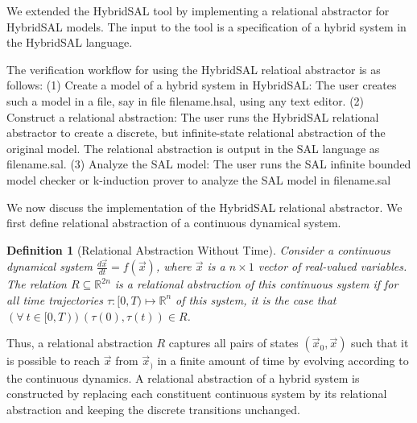 \documentclass{article}
\newtheorem{definition}{Definition}
\begin{document}
We extended the HybridSAL tool by implementing a 
relational abstractor for HybridSAL models.
The input to the tool is a specification of a hybrid system 
in the HybridSAL language.  

The verification workflow for using the HybridSAL relatioal
abstractor is as follows:
(1) Create a model of a hybrid system in HybridSAL:
 The user creates such a model in a file, say in 
 file filename.hsal, using any text editor.
(2) Construct a relational abstraction:
 The user runs the HybridSAL relational abstractor to create a discrete,
 but infinite-state relational abstraction of the original model.
 The relational abstraction is output in the SAL language as
 filename.sal.
(3) Analyze the SAL model:
 The user runs the SAL infinite bounded model checker or k-induction prover
 to analyze the SAL model in filename.sal

We now discuss the implementation of the HybridSAL relational abstractor.
We first define relational abstraction of a continuous dynamical
system. 

\begin{definition}[Relational Abstraction Without Time]\label{def-ra}
Consider a continuous dynamical system 
$\frac{d\vec{x}}{dt} = f(\vec{x})$, where $\vec{x}$ is a $n\times 1$
vector of real-valued variables.
The relation $R \subseteq \mathbb{R}^{2n}$ is a relational abstraction 
of this continuous system if  for all time
trajectories $\tau: [0,T) \mapsto \mathbb{R}^n$ of this system,
it is the case that
$ (\forall\ t \in [0,T))\ (\tau(0),\tau(t)) \in R$.
\end{definition}
Thus, a relational abstraction $R$
captures all pairs of states $(\vec{x}_0,\vec{x})$ such that it is possible to
reach $\vec{x}$ from $\vec{x}_)$ in a finite amount of time by evolving
according to the continuous dynamics.
A relational abstraction of a hybrid system is constructed by 
replacing each constituent continuous system by its relational 
abstraction and keeping the discrete transitions unchanged.
\end{document}
